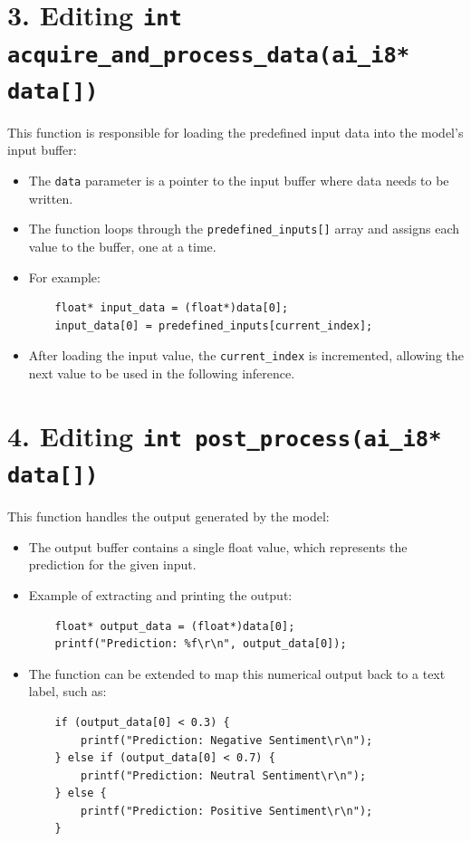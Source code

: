 \documentclass{article}
\begin{document}
\section*{3. Editing \texttt{int acquire\_and\_process\_data(ai\_i8* data[])}}
This function is responsible for loading the predefined input data into the model’s input buffer:
\begin{itemize}
    \item The \texttt{data} parameter is a pointer to the input buffer where data needs to be written.
    \item The function loops through the \texttt{predefined\_inputs[]} array and assigns each value to the buffer, one at a time.
    \item For example:
    \begin{verbatim}
    float* input_data = (float*)data[0];
    input_data[0] = predefined_inputs[current_index];
    \end{verbatim}
    \item After loading the input value, the \texttt{current\_index} is incremented, allowing the next value to be used in the following inference.
\end{itemize}

\section*{4. Editing \texttt{int post\_process(ai\_i8* data[])}}
This function handles the output generated by the model:
\begin{itemize}
    \item The output buffer contains a single float value, which represents the prediction for the given input.
    \item Example of extracting and printing the output:
    \begin{verbatim}
    float* output_data = (float*)data[0];
    printf("Prediction: %f\r\n", output_data[0]);
    \end{verbatim}
    \item The function can be extended to map this numerical output back to a text label, such as:
    \begin{verbatim}
    if (output_data[0] < 0.3) {
        printf("Prediction: Negative Sentiment\r\n");
    } else if (output_data[0] < 0.7) {
        printf("Prediction: Neutral Sentiment\r\n");
    } else {
        printf("Prediction: Positive Sentiment\r\n");
    }
    \end{verbatim}
\end{itemize}
\end{document}
